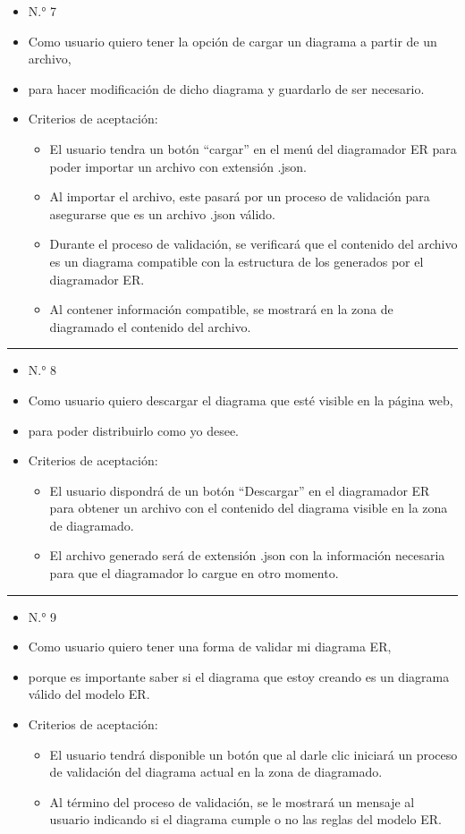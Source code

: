 \begin{itemize}
	\item N.° 7
	\item Como usuario quiero tener la opción de cargar un diagrama a partir de un archivo,
	\item para hacer modificación de dicho diagrama y guardarlo de ser necesario.
	\item Criterios de aceptación:
	\begin{itemize}
		\item El usuario tendra un botón ``cargar'' en el menú del diagramador ER para poder importar un archivo con extensión .json.
		\item Al importar el archivo, este pasará por un proceso de validación para asegurarse que es un archivo .json válido.
		\item Durante el proceso de validación, se verificará que el contenido del archivo es un diagrama compatible con la estructura de los generados por el diagramador ER.
		\item Al contener información compatible, se mostrará en la zona de diagramado el contenido del archivo.
	\end{itemize}
\end{itemize}
\noindent\rule{\textwidth}{1pt}
\begin{itemize}
	\item N.° 8
	\item Como usuario quiero descargar el diagrama que esté visible en la página web,
	\item para poder distribuirlo como yo desee.
	\item Criterios de aceptación:
	\begin{itemize}
		\item El usuario dispondrá de un botón ``Descargar'' en el diagramador ER para obtener un archivo con el contenido del diagrama visible en la zona de diagramado.
		\item El archivo generado será de extensión .json con la información necesaria para que el diagramador lo cargue en otro momento.
	\end{itemize}
\end{itemize}
\noindent\rule{\textwidth}{1pt}
\begin{itemize}
	\item N.° 9
	\item Como usuario quiero tener una forma de validar mi diagrama ER,
	\item porque es importante saber si el diagrama que estoy creando es un diagrama válido del modelo ER.
	\item Criterios de aceptación:
	\begin{itemize}
		\item El usuario tendrá disponible un botón que al darle clic iniciará un proceso de validación del diagrama actual en la zona de diagramado.
		\item Al término del proceso de validación, se le mostrará un mensaje al usuario indicando si el diagrama cumple o no las reglas del modelo ER.
	\end{itemize}
\end{itemize}
